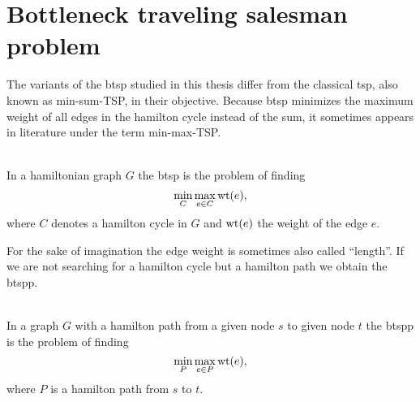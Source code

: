 \section{Bottleneck traveling salesman problem}
The variants of the \ac{btsp} studied in this thesis differ from the classical \ac{tsp}, also known as min-sum-TSP, in their objective. Because \ac{btsp} minimizes the maximum weight of all edges in the hamilton cycle instead of the sum, it sometimes appears in literature under the term min-max-TSP.

\begin{definition}\label{def:btsp}\ \\
  In a hamiltonian graph \(G\) the \ac{btsp} is the problem of finding
  \begin{equation*}
    \min\limits_{C} \max\limits_{e \in C} \textrm{wt}(e),
  \end{equation*}
  where \(C\) denotes a hamilton cycle in \(G\) and \(\textrm{wt}(e)\) the weight of the edge \(e\).
\end{definition}

For the sake of imagination the edge weight is sometimes also called \enquote{length}.
If we are not searching for a hamilton cycle but a hamilton path we obtain the \ac{btspp}.

\begin{definition}\label{def:btspp}\ \\
  In a graph \(G\) with a hamilton path from a given node \(s\) to given node \(t\) the \ac{btspp} is the problem of finding
  \begin{equation*}
    \min\limits_{P} \max\limits_{e \in P} \textrm{wt}(e),
  \end{equation*}
  where \(P\) is a hamilton path from \(s\) to \(t\).
\end{definition}
